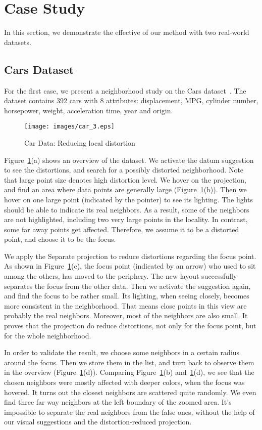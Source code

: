 \section{Case Study}
In this section, we demonstrate the effective of our method with two real-world datasets.

\subsection{Cars Dataset}
For the first case, we present a neighborhood study on the Cars dataset~\cite{Lichman:2013}. The dataset contains 392 cars with 8 attributes: displacement, MPG, cylinder number, horsepower, weight, acceleration time, year and origin.

\begin{figure}[htbp]
\centering
  \texttt{[image: images/car\_3.eps]}%
  \caption{Car Data: Reducing local distortion}
\label{fig:car}
  \end{figure}

Figure~\ref{fig:car}(a) shows an overview of the dataset. We activate the datum suggestion to see the distortions, and search for a possibly distorted neighborhood. Note that large point size denotes high distortion level. We hover on the projection, and find an area where data points are generally large (Figure~\ref{fig:car}(b)). Then we hover on one large point (indicated by the pointer) to see its lighting. The lights should be able to indicate its real neighbors. As a result, some of the neighbors are not highlighted, including two very large points in the locality. In contrast, some far away points get affected. Therefore, we assume it to be a distorted point, and choose it to be the focus.

We apply the Separate projection to reduce distortions regarding the focus point. As shown in Figure~\ref{fig:car}(c), the focus point (indicated by an arrow) who used to sit among the others, has moved to the periphery. The new layout successfully separates the focus from the other data. Then we activate the suggestion again, and find the focus to be rather small. Its lighting, when seeing closely, becomes more consistent in the neighborhood. That means close points in this view are probably the real neighbors. Moreover, most of the neighbors are also small. It proves that the projection do reduce distortions, not only for the focus point, but for the whole neighborhood.

In order to validate the result, we choose some neighbors in a certain radius around the focus. Then we store them in the list, and turn back to observe them in the overview (Figure~\ref{fig:car}(d)). Comparing Figure~\ref{fig:car}(b) and~\ref{fig:car}(d), we see that the chosen neighbors were mostly affected with deeper colors, when the focus was hovered. It turns out the closest neighbors are scattered quite randomly. We even find three far way neighbors at the left boundary of the zoomed area. It's impossible to separate the real neighbors from the false ones, without the help of our visual suggestions and the distortion-reduced projection.

